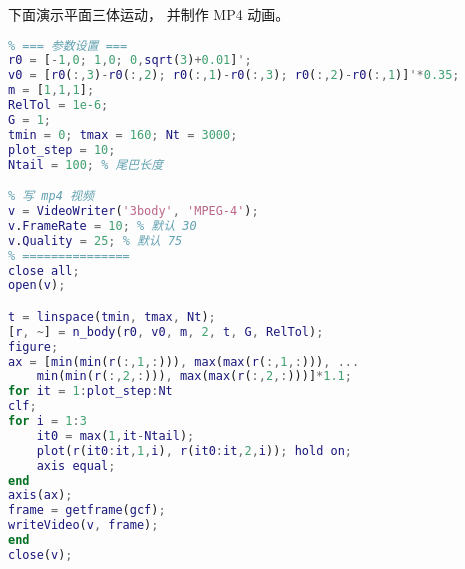 下面演示平面三体运动， 并制作 MP4 动画。
\begin{lstlisting}[language=matlab, caption=three\_body.m]
% 平面三体运动演示
% === 参数设置 ===
r0 = [-1,0; 1,0; 0,sqrt(3)+0.01]';
v0 = [r0(:,3)-r0(:,2); r0(:,1)-r0(:,3); r0(:,2)-r0(:,1)]'*0.35;
m = [1,1,1];
RelTol = 1e-6;
G = 1;
tmin = 0; tmax = 160; Nt = 3000;
plot_step = 10;
Ntail = 100; % 尾巴长度

% 写 mp4 视频
v = VideoWriter('3body', 'MPEG-4');
v.FrameRate = 10; % 默认 30
v.Quality = 25; % 默认 75
% ===============
close all;
open(v);

t = linspace(tmin, tmax, Nt);
[r, ~] = n_body(r0, v0, m, 2, t, G, RelTol);
figure;
ax = [min(min(r(:,1,:))), max(max(r(:,1,:))), ...
    min(min(r(:,2,:))), max(max(r(:,2,:)))]*1.1;
for it = 1:plot_step:Nt
clf;
for i = 1:3
    it0 = max(1,it-Ntail);
    plot(r(it0:it,1,i), r(it0:it,2,i)); hold on;
    axis equal;
end
axis(ax);
frame = getframe(gcf);
writeVideo(v, frame);
end
close(v);
\end{lstlisting}

